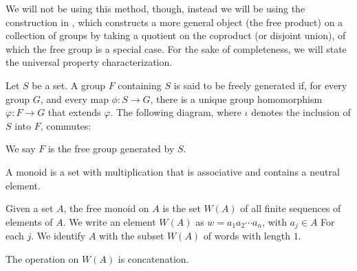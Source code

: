 We will not be using this method, though, instead we will be using the construction in \cite{delaHarpe_topics_in_geometric_group_theory}, which constructs a more general object (the free product) on a collection of groups by taking a quotient on the coproduct (or disjoint union), of which the free group is a special case. For the sake of completeness, we will state the universal property characterization.
\begin{definition}
  Let $S$ be a set. A group $F$ containing $S$ is said to be {freely generated} if, for every group $G$, and every map $\phi\colon S\rightarrow G$, there is a unique group homomorphism $\varphi\colon F\rightarrow G$ that extends $\varphi$. The following diagram, where $\iota$ denotes the inclusion of $S$ into $F$, commutes:
\begin{center}
\end{center}
We say $F$ is the {free group} generated by $S$.
\end{definition}
\begin{definition}
  A {monoid} is a set with multiplication that is associative and contains a neutral element.\newline

  Given a set $A$, the free monoid on $A$ is the set $W(A)$ of all finite sequences of elements of $A$. We write an element $W(A)$ as $w = a_1a_2\cdots a_n$, with $a_j\in A$ For each $j$. We identify $A$ with the subset $W(A)$ of words with length $1$.\newline

  The operation on $W(A)$ is concatenation.
\end{definition}

